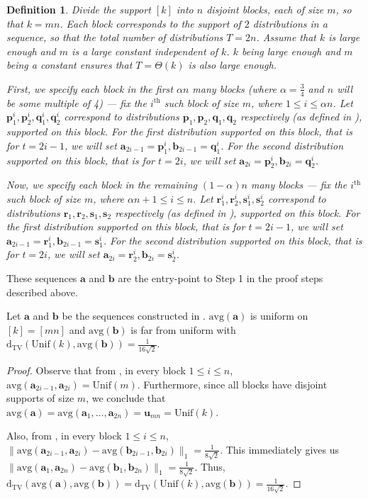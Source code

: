\documentclass[10pt]{article} %
\theoremstyle{plain}
\newtheorem{definition}[theorem]{Definition}
\newcommand{\bp}{\textbf{p}}
\newcommand{\unik}{\mathrm{Unif}(k)}%
\newcommand{\bq}{\textbf{q}}
\newcommand{\br}{\textbf{r}}
\newcommand{\bs}{\textbf{s}}
\newcommand{\dtv}{\mathrm{d_{TV}}}
\newcommand{\avg}{\mathrm{avg}}
\newcommand{\ba}{\textbf{a}}
\newcommand{\bb}{\textbf{b}}
\begin{document}
\begin{definition}
	\label{def:structure_a_b}
	Divide the support $[k]$ into $n$ disjoint blocks, each of size $m$, so that $k=mn$. Each block corresponds to the support of $2$ distributions in a sequence, so that the total number of distributions $T=2n$. Assume that $k$ is large enough and $m$ is a large constant independent of $k$. $k$ being large enough and $m$ being a constant ensures that $T = \Theta(k) $ is also large enough. 
	
	First, we specify each block in the first $\alpha n$ many blocks (where $\alpha=\frac34$ and $n$ will be some multiple of 4) --- fix the $i^{\text{th}}$ such block of size $m$, where $1 \le i \le \alpha n$. Let $\bp_1^i,\bp_2^i, \bq_1^i,\bq_2^i$ correspond to distributions $\bp_1,\bp_2, \bq_1,\bq_2$ respectively (as defined in ),  supported on this block. 
	For the first distribution supported on this block, that is for $t=2i-1$, we will set $\ba_{2i-1} = \bp_1^i, \bb_{2i-1} = \bq_1^i$. For the second distribution supported on this block, that is for $t=2i$, we will set $\ba_{2i}=\bp_2^i, \bb_{2i}=\bq_2^i$.
	
	Now, we specify each block in the remaining $(1-\alpha) n$ many blocks --- fix the $i^{\text{th}}$ such block of size $m$, where $\alpha n + 1 \le i \le n$. Let $\br_1^i,\br_2^i, \bs_1^i,\bs_2^i$ correspond to distributions $\br_1,\br_2, \bs_1,\bs_2$ respectively (as defined in ), supported on this block. For the first distribution supported on this block, that is for $t=2i-1$, we will set $\ba_{2i-1} = \br_1^i, \bb_{2i-1} = \bs_1^i$. For the second distribution supported on this block, that is for $t=2i$, we will set $\ba_{2i}=\br_2^i, \bb_{2i}=\bs_2^i$.
\end{definition}



These sequences $\ba$ and $\bb$ are the entry-point to Step 1 in the proof steps described above. 

\begin{claim}
	\label{claim:tv_bound_avg}
	Let $\ba$ and $\bb$ be the sequences constructed in . $\avg(\ba)$ is uniform on $[k]=[mn]$ and $\avg(\bb)$ is far from uniform with $\dtv(\unik, \avg(\bb)) =  \frac{1}{16\sqrt{2}}$.
\end{claim}
\begin{proof}
	Observe that from , in every block $1 \le i \le n$, $\avg(\ba_{2i-1}, \ba_{2i}) = \mathrm{Unif}(m)$. Furthermore, since all blocks have disjoint supports of size $m$, we conclude that $\avg(\ba) = \avg(\ba_1,\dots,\ba_{2n})=\textbf{u}_{mn} = \unik$.
	
	Also, from , in every block $1 \le i \le n$, $\|\avg(\ba_{2i-1}, \ba_{2i}) - \avg(\bb_{2i-1}, \bb_{2i})\|_1 = \frac{1}{8\sqrt{2}}$. This immediately gives us $\|\avg(\ba_{1}, \ba_{2n}) - \avg(\bb_{1}, \bb_{2n})\|_1 = \frac{1}{8\sqrt{2}}$. Thus, $\dtv(\avg(\ba), \avg(\bb)) = \dtv(\unik, \avg(\bb)) =  \frac{1}{16\sqrt{2}}$.
\end{proof}
\end{document}
